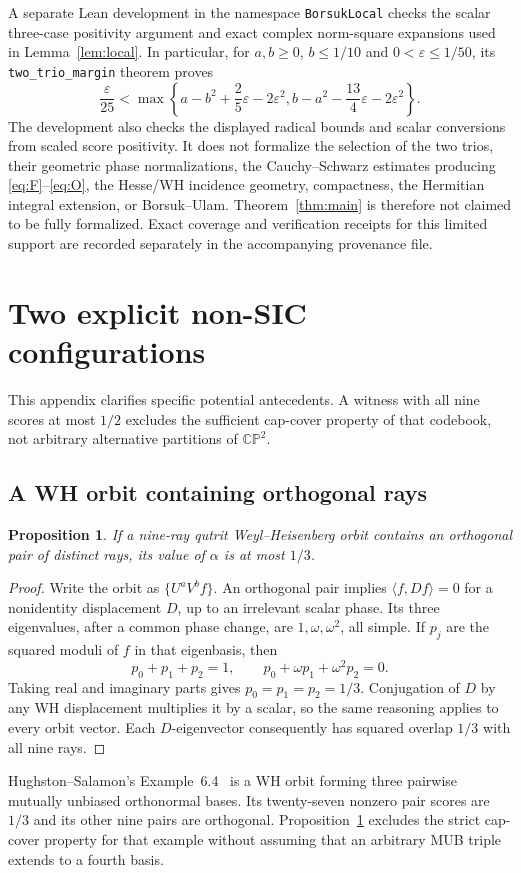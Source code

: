 \documentclass[11pt,a4paper]{article}
\newtheorem{proposition}[theorem]{Proposition}
\theoremstyle{remark}
\numberwithin{equation}{section}
\newcommand{\CP}{\mathbb{CP}}
\newcommand{\ip}[2]{\langle #1,#2\rangle}
\begin{document}
A separate Lean development in the namespace \texttt{BorsukLocal} checks the scalar three-case positivity argument and exact complex norm-square expansions used in Lemma~\ref{lem:local}. In particular, for $a,b\ge0$, $b\le1/10$ and $0<\varepsilon\le1/50$, its \texttt{two\_trio\_margin} theorem proves
\[
 \frac{\varepsilon}{25}<\max\left\{
 a-b^2+\frac25\varepsilon-2\varepsilon^2,
 b-a^2-\frac{13}4\varepsilon-2\varepsilon^2\right\}.
\]
The development also checks the displayed radical bounds and scalar conversions from scaled score positivity. It does not formalize the selection of the two trios, their geometric phase normalizations, the Cauchy--Schwarz estimates producing \eqref{eq:F}--\eqref{eq:O}, the Hesse/WH incidence geometry, compactness, the Hermitian integral extension, or Borsuk--Ulam. Theorem~\ref{thm:main} is therefore not claimed to be fully formalized. Exact coverage and verification receipts for this limited support are recorded separately in the accompanying provenance file.

\appendix
\section{Two explicit non-SIC configurations}\label{app:nonsic}
This appendix clarifies specific potential antecedents. A witness with all nine scores at most $1/2$ excludes the sufficient cap-cover property of that codebook, not arbitrary alternative partitions of $\CP^2$.

\subsection{A WH orbit containing orthogonal rays}
\begin{proposition}\label{prop:whorth}
If a nine-ray qutrit Weyl--Heisenberg orbit contains an orthogonal pair of distinct rays, its value of $\alpha$ is at most $1/3$.
\end{proposition}
\begin{proof}
Write the orbit as $\{U^aV^bf\}$. An orthogonal pair implies $\ip f{Df}=0$ for a nonidentity displacement $D$, up to an irrelevant scalar phase. Its three eigenvalues, after a common phase change, are $1,\omega,\omega^2$, all simple. If $p_j$ are the squared moduli of $f$ in that eigenbasis, then
\[
 p_0+p_1+p_2=1,\qquad p_0+\omega p_1+\omega^2p_2=0.
\]
Taking real and imaginary parts gives $p_0=p_1=p_2=1/3$. Conjugation of $D$ by any WH displacement multiplies it by a scalar, so the same reasoning applies to every orbit vector. Each $D$-eigenvector consequently has squared overlap $1/3$ with all nine rays.
\end{proof}
Hughston--Salamon's Example~6.4~\cite{HS} is a WH orbit forming three pairwise mutually unbiased orthonormal bases. Its twenty-seven nonzero pair scores are $1/3$ and its other nine pairs are orthogonal. Proposition~\ref{prop:whorth} excludes the strict cap-cover property for that example without assuming that an arbitrary MUB triple extends to a fourth basis.
\end{document}
